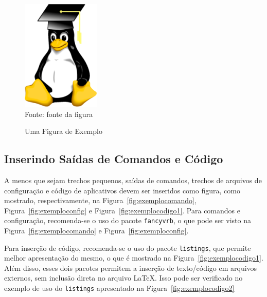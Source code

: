 \begin{figure}[!htb]
\centering
\caption{Uma Figura de Exemplo} %
\includegraphics[scale=0.9]{imgs/gradpenguin}\\  %
{\small Fonte: fonte da figura} %
\label{fig:exemplo} %
\end{figure}

\subsection{Inserindo Saídas de Comandos e Código}

A menos que sejam trechos pequenos, saídas de comandos, trechos de arquivos de configuração e código de aplicativos devem ser inseridos como figura, como mostrado, respectivamente, na Figura~\ref{fig:exemplocomando}, Figura~\ref{fig:exemploconfig} e Figura~\ref{fig:exemplocodigo1}. Para comandos e configuração, recomenda-se o uso do pacote {\tt fancyvrb}, o que pode ser visto na Figura~\ref{fig:exemplocomando} e Figura~\ref{fig:exemploconfig}.

Para inserção de código, recomenda-se o uso do pacote {\tt listings}, que permite melhor apresentação do mesmo, o que é mostrado na Figura~\ref{fig:exemplocodigo1}. Além disso, esses dois pacotes permitem a inserção de texto/código em arquivos externos, sem inclusão direta no arquivo \LaTeX. Isso pode ser verificado no exemplo de uso do {\tt listings} apresentado na Figura~\ref{fig:exemplocodigo2}

